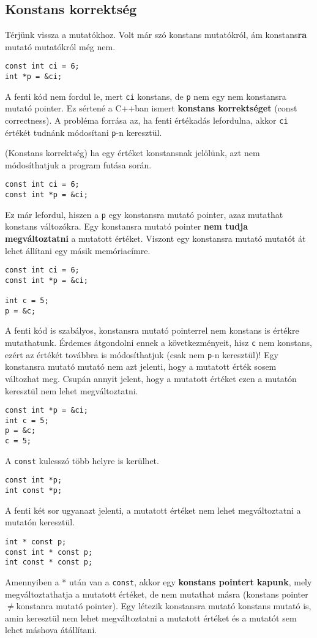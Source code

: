 \documentclass[a4paper,11.5pt,table]{article}
\begin{document}
	\subsection{Konstans korrektség}
	Térjünk vissza a mutatókhoz. Volt már szó konstans mutatókról, ám konstans\textbf{ra} mutató mutatókról még nem.
	\begin{lstlisting}
const int ci = 6;
int *p = &ci;
	\end{lstlisting}
	A fenti kód nem fordul le, mert \texttt{ci} konstans, de \texttt{p} nem egy nem konstansra mutató pointer. Ez sértené a C++ban ismert \textbf{konstans korrektséget} (const correctness). A probléma forrása az, ha fenti értékadás lefordulna, akkor \texttt{ci} értékét tudnánk módosítani \texttt{p}-n keresztül.
	\begin{definition}
		(Konstans korrektség) ha egy értéket konstansnak jelölünk, azt nem módosíthatjuk a program futása során. 
	\end{definition}
	\begin{lstlisting}
const int ci = 6;
const int *p = &ci;
	\end{lstlisting}
	Ez már lefordul, hiszen a \texttt{p} egy konstansra mutató pointer, azaz mutathat konstans változókra. Egy konstansra mutató pointer \textbf{nem tudja megváltoztatni} a mutatott értéket. Viszont egy konstansra mutató mutatót át lehet állítani egy másik memóriacímre.
	\begin{lstlisting}
const int ci = 6;
const int *p = &ci;

int c = 5;
p = &c;
	\end{lstlisting}
	A fenti kód is szabályos, konstansra mutató pointerrel nem konstans is értékre mutathatunk. Érdemes átgondolni ennek a következményeit, hisz \texttt{c} nem konstans, ezért az értékét továbbra is módosíthatjuk (csak nem \texttt{p}-n keresztül)! Egy konstansra mutató mutató nem azt jelenti, hogy a mutatott érték sosem változhat meg. Csupán annyit jelent, hogy a mutatott értéket ezen a mutatón keresztül nem lehet megváltoztatni.
	\begin{lstlisting}
const int *p = &ci;
int c = 5;
p = &c;
c = 5;
	\end{lstlisting}
  A \texttt{const} kulcsszó több helyre is kerülhet.
	\begin{lstlisting}
const int *p;
int const *p;
	\end{lstlisting}
	A fenti két sor ugyanazt jelenti, a mutatott értéket nem lehet megváltoztatni a mutatón keresztül.
	\begin{lstlisting}
int * const p;
const int * const p;
int const * const p;
	\end{lstlisting} 
	Amennyiben a * után van a \texttt{const}, akkor egy \textbf{konstans pointert kapunk}, mely megváltoztathatja a mutatott értéket, de nem mutathat másra (konstans pointer \quad $\not=$\quad konstanra mutató pointer). Egy létezik konstansra mutató konstans mutató is, amin keresztül nem lehet megváltoztatni a mutatott értéket és a mutatót sem lehet máshova átállítani.
\end{document}
